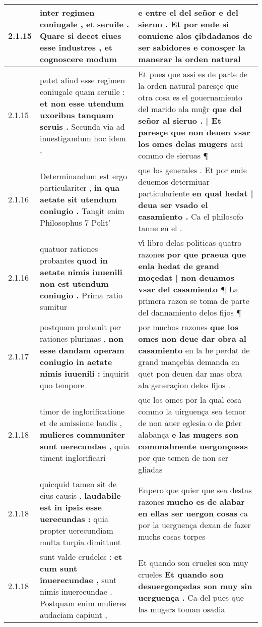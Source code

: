 \begin{tabular}{|p{1cm}|p{6.5cm}|p{6.5cm}|}
2.1.15 & inter regimen coniugale , et seruile . \textbf{ Quare si decet ciues esse industres , } et cognoscere modum & e entre el del señor e del sieruo . \textbf{ Et por ende si conuiene alos çibdadanos de ser sabidores } e conosçer la manerar la orden natural \\\hline
2.1.15 & patet aliud esse regimen coniugale quam seruile : \textbf{ et non esse utendum uxoribus tanquam seruis . } Secunda via ad inuestigandum hoc idem , & Et pues que assi es de parte de la orden natural paresçe que otra cosa es el gouernamiento del marido ala mug̃r \textbf{ que del señor al sieruo . | Et paresçe que non deuen vsar los omes delas mugers } assi commo de sieruas ¶ \\\hline
2.1.16 & Determinandum est ergo particulariter , \textbf{ in qua aetate sit utendum coniugio . } Tangit enim Philosophus 7 Polit’ & que los generales . Et por ende deuemos determiuar particulariente \textbf{ en qual hedat | deua ser vsado el casamiento . } Ca el philosofo tanne en el . \\\hline
2.1.16 & quatuor rationes probantes \textbf{ quod in aetate nimis iuuenili non est utendum coniugio . } Prima ratio sumitur & vi̊ libro delas politicas quatro razones \textbf{ por que praeua que enla hedat de grand moçedat | non deuamos vsar del casamiento ¶ } La primera razon se toma de parte del dannamiento delos fijos ¶ \\\hline
2.1.17 & postquam probauit per rationes plurimas , \textbf{ non esse dandam operam coniugio in aetate nimis iuuenili : } inquirit quo tempore & por muchos razones \textbf{ que los omes non deue dar obra al casamiento } en la he perdat de grand mançebia demanda en quet pon deuen dar mas obra ala generaçion delos fijos . \\\hline
2.1.18 & timor de inglorificatione et de amissione laudis , \textbf{ mulieres communiter sunt uerecundae , } quia timent inglorificari & que los omes por la qual cosa commo la uirguença sea temor de non auer eglesia o de ꝑder alabança \textbf{ e las mugers son comunalmente uergonçosas } por que temen de non ser gliadas \\\hline
2.1.18 & quicquid tamen sit de eius causis , \textbf{ laudabile est in ipsis esse uerecundas : } quia propter uerecundiam multa turpia dimittunt & Enpero que quier que sea destas razones \textbf{ mucho es de alabar en ellas ser uergon cosas } ca por la uerguença dexan de fazer muchs cosas torpes \\\hline
2.1.18 & sunt valde crudeles : \textbf{ et cum sunt inuerecundae , } sunt nimis inuerecundae . Postquam enim mulieres audaciam capiunt , & Et quando son crueles son muy crueles \textbf{ Et quando son desuergonçedas son muy sin uerguença . } Ca del pues que las mugers toman osadia \\\hline

\end{tabular}
